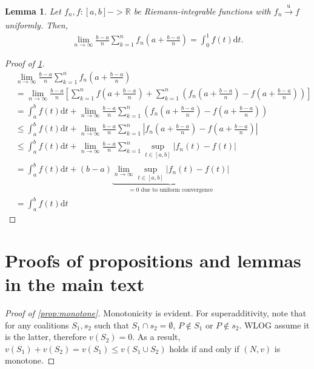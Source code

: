 \documentclass[a4paper]{article}
\newtheorem{lemma}{Lemma}
\newcommand{\dt}{\mathrm{d}t}
\begin{document}
\begin{lemma}
    \label{lemma:integral_convergence}
    Let $f_n, f: [a, b] -> \mathbb{R}$ be Riemann-integrable functions with $f_n \xrightarrow[]{\mathrm{u}} f$ uniformly.
    Then,
    \begin{align*}
        \lim_{n \to \infty} \frac{b-a}{n} \sum_{k=1}^n f_n \left( a + \frac{b-a}{n} \right) = \int_0^1 f(t) \dt.
    \end{align*}
\end{lemma}
\begin{proof}[Proof of \cref{lemma:integral_convergence}]
    \begin{align*}
        &\lim_{n \to \infty} \frac{b-a}{n} \sum_{k=1}^n f_n \left( a + \frac{b-a}{n} \right) \\
        &= \lim_{n \to \infty} \frac{b-a}{n} \left[ \sum_{k=1}^n f \left( a + \frac{b-a}{n} \right) + \sum_{k=1}^n \left( f_n \left( a + \frac{b-a}{n} \right) - f \left( a + \frac{b-a}{n} \right) \right) \right] \\
        &= \int_a^b f(t) \dt + \lim_{n \to \infty} \frac{b-a}{n}\sum_{k=1}^n \left( f_n \left( a + \frac{b-a}{n} \right) - f \left( a + \frac{b-a}{n} \right) \right) \\
        &\leq \int_a^b f(t) \dt + \lim_{n \to \infty} \frac{b-a}{n}\sum_{k=1}^n \left| f_n \left( a + \frac{b-a}{n} \right) - f \left( a + \frac{b-a}{n} \right) \right| \\
        &\leq \int_a^b f(t) \dt + \lim_{n \to \infty} \frac{b-a}{n}\sum_{k=1}^n \sup_{t \in [a, b]} \left| f_n(t) - f(t) \right| \\
        &= \int_a^b f(t) \dt + (b-a) \underbrace{\lim_{n \to \infty} \sup_{t \in [a, b]} \left| f_n(t) - f(t) \right|}_{=0 \text{ due to uniform convergence}} \\
        &= \int_a^b f(t) \dt
    \end{align*}
\end{proof}


\section{Proofs of propositions and lemmas in the main text}
\label{sec:proofs}

\begin{proof}[Proof of \cref{prop:monotone}]
    Monotonicity is evident.
    For superadditivity, note that for any coalitions $S_1, s_2$ such that $S_1 \cap s_2 = \emptyset$, $P \notin S_1$ or $P \notin s_2$.
    WLOG assume it is the latter, therefore $v(S_2) = 0$.
    As a result, $v(S_1) + v(S_2) = v(S_1) \leq v(S_1 \cup S_2)$ holds if and only if $(N, v)$ is monotone.
\end{proof}
\end{document}
